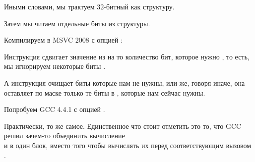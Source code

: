 Иными словами, мы трактуем 32-битный \Tint как структуру.

Затем мы читаем отдельные биты из структуры.


Компилируем в MSVC 2008 с опцией \Ox:



Инструкция  сдвигает значение из \EAX на то количество бит, 
которое нужно , то есть, мы игнорируем некоторые биты .

А инструкция \AND очищает биты  которые нам не нужны, или же, говоря иначе, 
она оставляет по маске только те биты в \EAX, которые нам сейчас нужны.




Попробуем GCC 4.4.1 с опцией \Othree.



Практически, то же самое. Единственное что стоит отметить это то, что GCC решил зачем-то объединить 
вычисление \\
 и  в один блок, 
вместо того чтобы вычислять их перед соответствующим вызовом \printf.


